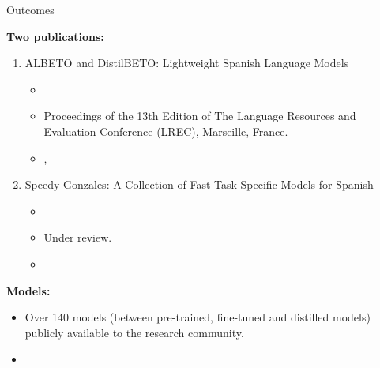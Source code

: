 \documentclass[aspectratio=169,xcolor=dvipsnames]{beamer}
\begin{document}
\begin{frame}{Outcomes}

\textbf{Two publications:}
\begin{enumerate}
    \item ALBETO and DistilBETO: Lightweight Spanish Language Models
    \begin{itemize}
        \item \citet{canete-etal-2022-albeto}
        \item Proceedings of the 13th Edition of The Language Resources and Evaluation Conference (LREC), Marseille, France.
        \item \href{https://aclanthology.org/2022.lrec-1.457/}{\color{blue}{Paper}}, \href{https://github.com/dccuchile/lightweight-spanish-language-models}{\color{blue}{Code}}
    \end{itemize}
    \item Speedy Gonzales: A Collection of Fast Task-Specific Models for Spanish
    \begin{itemize}
        \item \citet{canete2023speedy}
        \item Under review.
        \item \href{https://github.com/dccuchile/speedy-gonzales}{\color{blue}{Code}}
    \end{itemize}
\end{enumerate}

\textbf{Models:}
\begin{itemize}
    \item Over 140 models (between pre-trained, fine-tuned and distilled models) publicly available to the research community.
    \item \href{https://huggingface.co/dccuchile}{\color{blue}{Models at the HuggingFace Hub}}
\end{itemize}

\end{frame}

\begin{frame}
    \titlepage
\end{frame}
\end{document}
